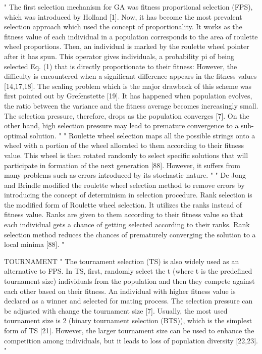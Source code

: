 "
The first selection mechanism for GA was fitness proportional selection (FPS), which was introduced by Holland [1]. Now, it has become the most prevalent selection approach which used the concept of proportionality. It works as the fitness value of each individual in a population corresponds to the area of roulette wheel proportions. Then, an individual is marked by the roulette wheel pointer after it has spun. This operator gives individuals, a probability pi of being selected Eq. (1) that is directly proportionate to their fitness:
However, the difficulty is encountered when a significant difference appears in the fitness values [14,17,18]. The scaling problem which is the major drawback of this scheme was first pointed out by Grefenstette [19]. It has happened when population evolves, the ratio between the variance and the fitness average becomes increasingly small. The selection pressure, therefore, drops as the population converges [7]. On the other hand, high selection pressure may lead to premature convergence to a sub-optimal solution.
"\cite{hussain_trade-off_2020}
"
Roulette wheel selection maps all the possible strings onto a wheel with a portion of the wheel allocated to them according to their fitness value. This wheel is then rotated randomly to select specific solutions that will participate in formation of the next generation [88]. However, it suffers from many problems such as errors introduced by its stochastic nature.
"\cite{katoch_review_2021}
"
De Jong and Brindle modified the roulette wheel selection method to remove errors by introducing the concept of determinism in selection procedure. Rank selection is the modified form of Roulette wheel selection. It utilizes the ranks instead of fitness value. Ranks are given to them according to their fitness value so that each individual gets a chance of getting selected according to their ranks. Rank selection method reduces the chances of prematurely converging the solution to a local minima [88].
"\cite{katoch_review_2021}


TOURNAMENT
"
The tournament selection (TS) is also widely used as an alternative to FPS. In TS, first, randomly select the t (where t is the predefined tournament size) individuals from the population and then they compete against each other based on their fitness. An individual with higher fitness value is declared as a winner and selected for mating process. The selection pressure can be adjusted with change the tournament size [7]. Usually, the most used tournament size is 2 (binary tournament selection (BTS)), which is the simplest form of TS [21]. However, the larger tournament size can be used to enhance the competition among individuals, but it leads to loss of population diversity [22,23].
"\cite{hussain_trade-off_2020}


